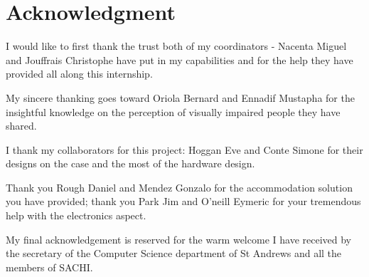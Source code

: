 \section*{Acknowledgment}

I would like to first thank the trust both of my coordinators - Nacenta Miguel and Jouffrais Christophe have put in my capabilities and for the help they have provided all along this internship.

My sincere thanking goes toward Oriola Bernard and Ennadif Mustapha for the insightful knowledge on the perception of visually impaired people they have shared.

I thank my collaborators for this project: Hoggan Eve and Conte Simone for their designs on the case and the most of the hardware design.

Thank you Rough Daniel and Mendez Gonzalo for the accommodation solution you have provided; thank you Park Jim and O'neill Eymeric for your tremendous help with the electronics aspect.

My final acknowledgement is reserved for the warm welcome I have received by the secretary of the Computer Science department of St Andrews and all the members of SACHI.